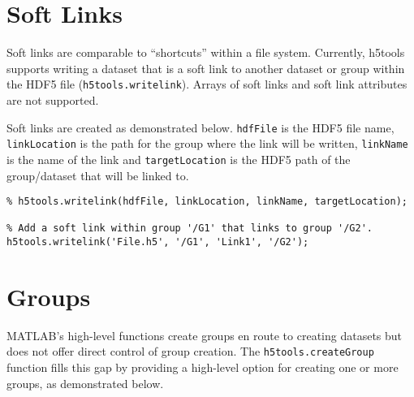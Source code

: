 \documentclass[11pt]{exam}
\newcommand\myfcn[1]{\colorbox{codegray}{\textcolor{codeblue}{\texttt{#1}}}}
\begin{document}
                                             

    \section{Soft Links}\label{sec:links}
    	\noindent Soft links are comparable to ``shortcuts'' within a file system. Currently, h5tools supports writing a dataset that is a soft link to another dataset or group within the HDF5 file (\myfcn{h5tools.writelink}). Arrays of soft links and soft link attributes are not supported.
        
        Soft links are created as demonstrated below. \texttt{hdfFile} is the HDF5 file name, \texttt{linkLocation} is the path for the group where the link will be written, \texttt{linkName} is the name of the link and \texttt{targetLocation} is the HDF5 path of the group/dataset that will be linked to.
    \begin{lstlisting}[style=matlab-editor, basicstyle=\mlttfamily\footnotesize]
% SYNTAX:
% h5tools.writelink(hdfFile, linkLocation, linkName, targetLocation);

% Add a soft link within group '/G1' that links to group '/G2'.
h5tools.writelink('File.h5', '/G1', 'Link1', '/G2');
    \end{lstlisting}

                                                       

	\section{Groups}\label{sec:groups}
		\noindent MATLAB's high-level functions create groups en route to creating datasets but does not offer direct control of group creation. The \myfcn{h5tools.createGroup} function fills this gap by providing a high-level option for creating one or more groups, as demonstrated below.
\end{document}
